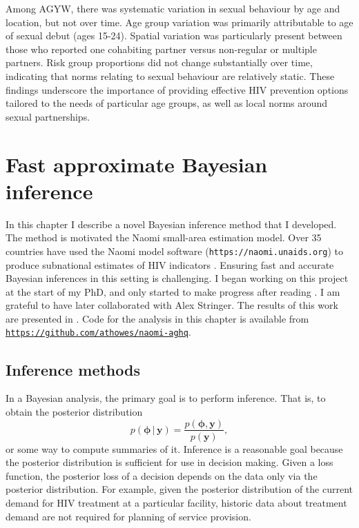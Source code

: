 \documentclass[a4paper, nobind]{templates/ociamthesis}
\begin{document}
Among AGYW, there was systematic variation in sexual behaviour by age and location, but not over time.
Age group variation was primarily attributable to age of sexual debut (ages 15-24).
Spatial variation was particularly present between those who reported one cohabiting partner versus non-regular or multiple partners.
Risk group proportions did not change substantially over time, indicating that norms relating to sexual behaviour are relatively static.
These findings underscore the importance of providing effective HIV prevention options tailored to the needs of particular age groups, as well as local norms around sexual partnerships.

\hypertarget{naomi-aghq}{%
\chapter{Fast approximate Bayesian inference}\label{naomi-aghq}}

\adjustmtc
{}

In this chapter I describe a novel Bayesian inference method that I developed.
The method is motivated the Naomi small-area estimation model.
Over 35 countries have used the Naomi model software (\texttt{https://naomi.unaids.org}) to produce subnational estimates of HIV indicators \autocite{unaids2023global}.
Ensuring fast and accurate Bayesian inferences in this setting is challenging.
I began working on this project at the start of my PhD, and only started to make progress after reading \textcite{stringer2021fast}.
I am grateful to have later collaborated with Alex Stringer.
The results of this work are presented in \textcite{howes2023fast}.
Code for the analysis in this chapter is available from \href{https://github.com/athowes/elgm-inf}{\texttt{https://github.com/athowes/naomi-aghq}}.

\hypertarget{inference-methods}{%
\section{Inference methods}\label{inference-methods}}

In a Bayesian analysis, the primary goal is to perform inference.
That is, to obtain the posterior distribution
\begin{equation}
p(\boldsymbol{\mathbf{\phi}} \, | \, \mathbf{y}) = \frac{p(\boldsymbol{\mathbf{\phi}}, \mathbf{y})}{p(\mathbf{y})},
\end{equation}
or some way to compute summaries of it.
Inference is a reasonable goal because the posterior distribution is sufficient for use in decision making.
Given a loss function, the posterior loss of a decision depends on the data only via the posterior distribution.
For example, given the posterior distribution of the current demand for HIV treatment at a particular facility, historic data about treatment demand are not required for planning of service provision.
\end{document}

